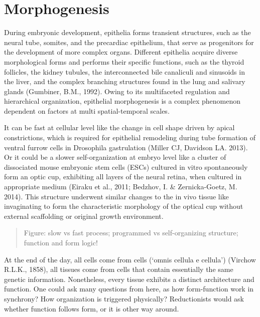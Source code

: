 
\hypertarget{morphogenesis}{%
	\chapter{Morphogenesis}\label{morphogenesis}}

During embryonic development, epithelia forms transient structures, such
as the neural tube, somites, and the precardiac epithelium, that serve
as progenitors for the development of more complex organs. Different
epithelia acquire diverse morphological forms and performs their
specific functions, such as the thyroid follicles, the kidney tubules,
the interconnected bile canaliculi and sinusoids in the liver, and the
complex branching structures found in the lung and salivary glands
(Gumbiner, B.M., 1992). Owing to its multifaceted regulation and
hierarchical organization, epithelial morphogenesis is a complex
phenomenon dependent on factors at multi spatial-temporal scales.

It can be fast at cellular level like the change in cell shape driven by
apical constrictions, which is required for epithelial remodeling during
tube formation of ventral furrow cells in Drosophila gastrulation
(Miller CJ, Davidson LA. 2013). Or it could be a slower
self-organization at embryo level like a cluster of dissociated mouse
embryonic stem cells (ESCs) cultured in vitro spontaneously form an
optic cup, exhibiting all layers of the neural retina, when cultured in
appropriate medium (Eiraku et al., 2011; Bedzhov, I. \& Zernicka-Goetz,
M. 2014). This structure underwent similar changes to the in vivo tissue
like invaginating to form the characteristic morphology of the optical
cup without external scaffolding or original growth environment.

\begin{quote}
	Figure: slow vs fast process; programmed vs self-organizing structure;
	function and form logic!
\end{quote}

At the end of the day, all cells come from cells (`omnis cellula e
cellula') (Virchow R.L.K., 1858), all tissues come from cells that
contain essentially the same genetic information. Nonetheless, every
tissue exhibits a distinct architecture and function. One could ask many
questions from here, as how form-function work in synchrony? How
organization is triggered physically? Reductionists would ask whether
function follows form, or it is other way around.

